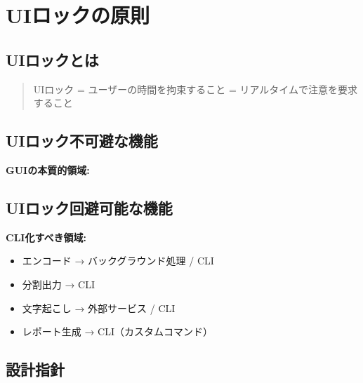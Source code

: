 \documentclass[10pt,a4paper,twocolumn]{ltjsarticle}
\begin{document}
\section{UIロックの原則}

\subsection{UIロックとは}

\begin{quote}
UIロック = ユーザーの時間を拘束すること = リアルタイムで注意を要求すること
\end{quote}

\subsection{UIロック不可避な機能}

\textbf{GUIの本質的領域:}

\vspace{0.5\baselineskip}
\vspace{0.5\baselineskip}

\subsection{UIロック回避可能な機能}

\textbf{CLI化すべき領域:}

\begin{itemize}
\item エンコード → バックグラウンド処理 / CLI
\item 分割出力 → CLI
\item 文字起こし → 外部サービス / CLI
\item レポート生成 → CLI（カスタムコマンド）
\end{itemize}

\subsection{設計指針}
\end{document}
